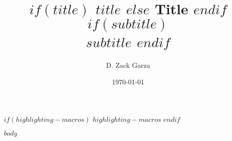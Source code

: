 

\title{
\textbf{
  $if(title)$
  $title$
  $else$
  Title
  $endif$
}
  $if(subtitle)$
  \\ {\normalsize $subtitle$}
  $endif$
}
\author{D. Zack Garza}
\date{\today}

$if(highlighting-macros)$
$highlighting-macros$
$endif$


\maketitle
\tableofcontents


$body$





